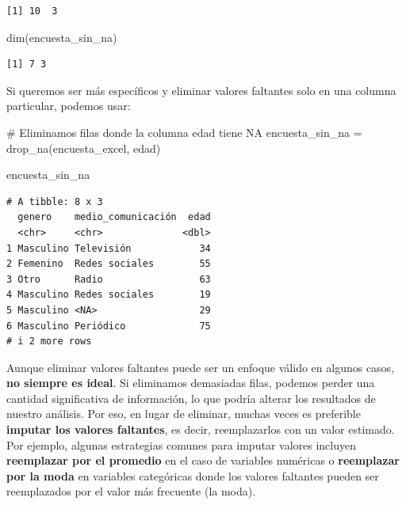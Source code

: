 \documentclass[
  letterpaper,
  DIV=11,
  numbers=noendperiod,
  twoside]{scrreprt}
\newenvironment{Shaded}{\begin{snugshade}}{\end{snugshade}}
\newcommand{\CommentTok}[1]{\textcolor[rgb]{0.37,0.37,0.37}{#1}}
\newcommand{\FunctionTok}[1]{\textcolor[rgb]{0.28,0.35,0.67}{#1}}
\newcommand{\NormalTok}[1]{\textcolor[rgb]{0.00,0.23,0.31}{#1}}
\newcommand{\OtherTok}[1]{\textcolor[rgb]{0.00,0.23,0.31}{#1}}
\begin{document}
\begin{verbatim}
[1] 10  3
\end{verbatim}

\begin{Shaded}
\begin{Highlighting}[]
\FunctionTok{dim}\NormalTok{(encuesta\_sin\_na)}
\end{Highlighting}
\end{Shaded}

\begin{verbatim}
[1] 7 3
\end{verbatim}

Si queremos ser más específicos y eliminar valores faltantes solo en una
columna particular, podemos usar:

\begin{Shaded}
\begin{Highlighting}[]
\CommentTok{\# Eliminamos filas donde la columna \textquotesingle{}edad\textquotesingle{} tiene NA}
\NormalTok{encuesta\_sin\_na }\OtherTok{=} \FunctionTok{drop\_na}\NormalTok{(encuesta\_excel, edad)}

\NormalTok{encuesta\_sin\_na}
\end{Highlighting}
\end{Shaded}

\begin{verbatim}
# A tibble: 8 x 3
  genero    medio_comunicación  edad
  <chr>     <chr>              <dbl>
1 Masculino Televisión            34
2 Femenino  Redes sociales        55
3 Otro      Radio                 63
4 Masculino Redes sociales        19
5 Masculino <NA>                  29
6 Masculino Periódico             75
# i 2 more rows
\end{verbatim}

\begin{tcolorbox}[enhanced jigsaw, titlerule=0mm, title=\textcolor{quarto-callout-caution-color}{\faFire}\hspace{0.5em}{Cuidado}, colback=white, opacityback=0, breakable, toprule=.15mm, left=2mm, leftrule=.75mm, colframe=quarto-callout-caution-color-frame, bottomtitle=1mm, rightrule=.15mm, opacitybacktitle=0.6, coltitle=black, arc=.35mm, bottomrule=.15mm, toptitle=1mm, colbacktitle=quarto-callout-caution-color!10!white]

Aunque eliminar valores faltantes puede ser un enfoque válido en algunos
casos, \textbf{no siempre es ideal}. Si eliminamos demasiadas filas,
podemos perder una cantidad significativa de información, lo que podría
alterar los resultados de nuestro análisis. Por eso, en lugar de
eliminar, muchas veces es preferible \textbf{imputar los valores
faltantes}, es decir, reemplazarlos con un valor estimado. Por ejemplo,
algunas estrategias comunes para imputar valores incluyen
\textbf{reemplazar por el promedio} en el caso de variables numéricas o
\textbf{reemplazar por la moda} en variables categóricas donde los
valores faltantes pueden ser reemplazados por el valor más frecuente (la
moda).

\end{tcolorbox}
\end{document}
